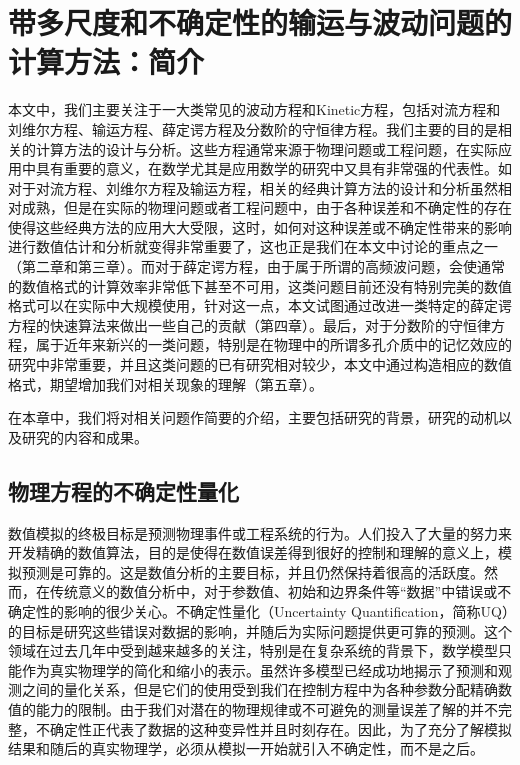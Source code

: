 

\chapter{带多尺度和不确定性的输运与波动问题的计算方法：简介}
\label{chap:intro}

本文中，我们主要关注于一大类常见的波动方程和Kinetic方程，包括对流方程和刘维尔方程、输运方程、薛定谔方程及分数阶的守恒律方程。我们主要的目的是相关的计算方法的设计与分析。这些方程通常来源于物理问题或工程问题，在实际应用中具有重要的意义，在数学尤其是应用数学的研究中又具有非常强的代表性。如对于对流方程、刘维尔方程及输运方程，相关的经典计算方法的设计和分析虽然相对成熟，但是在实际的物理问题或者工程问题中，由于各种误差和不确定性的存在使得这些经典方法的应用大大受限，这时，如何对这种误差或不确定性带来的影响进行数值估计和分析就变得非常重要了，这也正是我们在本文中讨论的重点之一（第二章和第三章）。而对于薛定谔方程，由于属于所谓的高频波问题，会使通常的数值格式的计算效率非常低下甚至不可用，这类问题目前还没有特别完美的数值格式可以在实际中大规模使用，针对这一点，本文试图通过改进一类特定的薛定谔方程的快速算法来做出一些自己的贡献（第四章）。最后，对于分数阶的守恒律方程，属于近年来新兴的一类问题，特别是在物理中的所谓多孔介质中的记忆效应的研究中非常重要，并且这类问题的已有研究相对较少，本文中通过构造相应的数值格式，期望增加我们对相关现象的理解（第五章）。

在本章中，我们将对相关问题作简要的介绍，主要包括研究的背景，研究的动机以及研究的内容和成果。
\section{物理方程的不确定性量化}

数值模拟的终极目标是预测物理事件或工程系统的行为。人们投入了大量的努力来开发精确的数值算法，目的是使得在数值误差得到很好的控制和理解的意义上，模拟预测是可靠的。这是数值分析的主要目标，并且仍然保持着很高的活跃度。然而，在传统意义的数值分析中，对于参数值、初始和边界条件等“数据”中错误或不确定性的影响的很少关心。不确定性量化（Uncertainty Quantification，简称UQ）的目标是研究这些错误对数据的影响，并随后为实际问题提供更可靠的预测。这个领域在过去几年中受到越来越多的关注，特别是在复杂系统的背景下，数学模型只能作为真实物理学的简化和缩小的表示。虽然许多模型已经成功地揭示了预测和观测之间的量化关系，但是它们的使用受到我们在控制方程中为各种参数分配精确数值的能力的限制。由于我们对潜在的物理规律或不可避免的测量误差了解的并不完整，不确定性正代表了数据的这种变异性并且时刻存在。因此，为了充分了解模拟结果和随后的真实物理学，必须从模拟一开始就引入不确定性，而不是之后。

